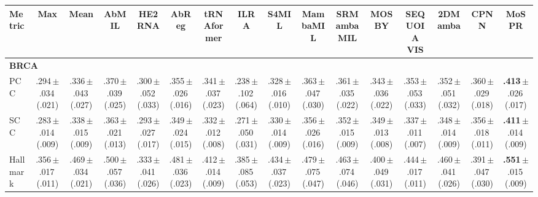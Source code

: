 \begin{table}
\centering
\tiny
\setlength{\tabcolsep}{2.2pt}
\renewcommand{\arraystretch}{1.25}
\begin{tabular}{lccccccccccccccc}
\toprule
Metric & Max & Mean & AbMIL & HE2RNA & AbReg & tRNAformer & ILRA & S4MIL & MambaMIL & SRMambaMIL & MOSBY & SEQUOIA VIS & 2DMamba & CPNN & MoSPR\\
\midrule
\multicolumn{16}{l}{\textbf{BRCA}}\\
\quad PCC & .294\,{\tiny$\pm$.034}\,{\tiny(.021)} & .336\,{\tiny$\pm$.043}\,{\tiny(.027)} & .370\,{\tiny$\pm$.039}\,{\tiny(.025)} & .300\,{\tiny$\pm$.052}\,{\tiny(.033)} & .355\,{\tiny$\pm$.026}\,{\tiny(.016)} & .341\,{\tiny$\pm$.037}\,{\tiny(.023)} & .238\,{\tiny$\pm$.102}\,{\tiny(.064)} & .328\,{\tiny$\pm$.016}\,{\tiny(.010)} & .363\,{\tiny$\pm$.047}\,{\tiny(.030)} & .361\,{\tiny$\pm$.035}\,{\tiny(.022)} & .343\,{\tiny$\pm$.036}\,{\tiny(.022)} & .353\,{\tiny$\pm$.053}\,{\tiny(.033)} & .352\,{\tiny$\pm$.051}\,{\tiny(.032)} & .360\,{\tiny$\pm$.029}\,{\tiny(.018)} & \textbf{.413}\,{\tiny$\pm$.026}\,{\tiny(.017)}\\
\quad SCC & .283\,{\tiny$\pm$.014}\,{\tiny(.009)} & .338\,{\tiny$\pm$.015}\,{\tiny(.009)} & .363\,{\tiny$\pm$.021}\,{\tiny(.013)} & .293\,{\tiny$\pm$.027}\,{\tiny(.017)} & .349\,{\tiny$\pm$.024}\,{\tiny(.015)} & .332\,{\tiny$\pm$.012}\,{\tiny(.008)} & .271\,{\tiny$\pm$.050}\,{\tiny(.031)} & .330\,{\tiny$\pm$.014}\,{\tiny(.009)} & .356\,{\tiny$\pm$.026}\,{\tiny(.016)} & .352\,{\tiny$\pm$.015}\,{\tiny(.009)} & .349\,{\tiny$\pm$.013}\,{\tiny(.008)} & .337\,{\tiny$\pm$.011}\,{\tiny(.007)} & .348\,{\tiny$\pm$.014}\,{\tiny(.009)} & .356\,{\tiny$\pm$.018}\,{\tiny(.011)} & \textbf{.411}\,{\tiny$\pm$.014}\,{\tiny(.009)}\\
\quad Hallmark & .356\,{\tiny$\pm$.017}\,{\tiny(.011)} & .469\,{\tiny$\pm$.034}\,{\tiny(.021)} & .500\,{\tiny$\pm$.057}\,{\tiny(.036)} & .333\,{\tiny$\pm$.041}\,{\tiny(.026)} & .481\,{\tiny$\pm$.036}\,{\tiny(.023)} & .412\,{\tiny$\pm$.014}\,{\tiny(.009)} & .385\,{\tiny$\pm$.085}\,{\tiny(.053)} & .434\,{\tiny$\pm$.037}\,{\tiny(.023)} & .479\,{\tiny$\pm$.075}\,{\tiny(.047)} & .463\,{\tiny$\pm$.074}\,{\tiny(.046)} & .400\,{\tiny$\pm$.049}\,{\tiny(.031)} & .444\,{\tiny$\pm$.017}\,{\tiny(.011)} & .460\,{\tiny$\pm$.041}\,{\tiny(.026)} & .391\,{\tiny$\pm$.047}\,{\tiny(.030)} & \textbf{.551}\,{\tiny$\pm$.015}\,{\tiny(.009)}\\

\end{tabular}
\end{table}
